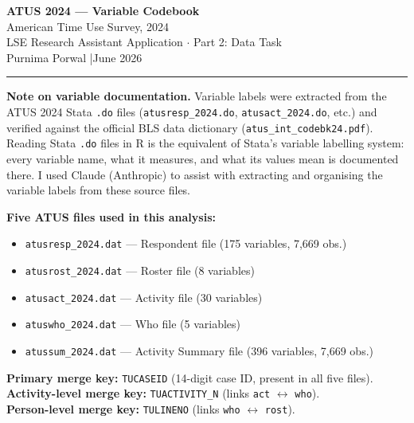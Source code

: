\documentclass[11pt, a4paper]{article}
\begin{document}

\begin{center}
{\LARGE\bfseries\color{headerblue}ATUS 2024 --- Variable Codebook}\\[6pt]
{\large American Time Use Survey, 2024}\\[4pt]
{\normalsize LSE Research Assistant Application $\cdot$ Part 2: Data Task}\\[4pt]
{\normalsize Purnima Porwal \quad|\quad June 2026}
\end{center}
\vspace{6pt}\hrule\vspace{10pt}

\begin{tcolorbox}[notebox]
\textbf{Note on variable documentation.}
Variable labels were extracted from the ATUS 2024 Stata \texttt{.do} files
(\texttt{atusresp\_2024.do}, \texttt{atusact\_2024.do}, etc.) and verified
against the official BLS data dictionary (\texttt{atus\_int\_codebk24.pdf}).
Reading Stata \texttt{.do} files in R is the equivalent of Stata's variable
labelling system: every variable name, what it measures, and what its values
mean is documented there. I used Claude (Anthropic) to assist with extracting
and organising the variable labels from these source files.
\end{tcolorbox}

\vspace{6pt}
\textbf{Five ATUS files used in this analysis:}
\begin{itemize}[nosep, leftmargin=1.4em]
  \item \texttt{atusresp\_2024.dat} --- Respondent file (175 variables, 7{,}669 obs.)
  \item \texttt{atusrost\_2024.dat} --- Roster file (8 variables)
  \item \texttt{atusact\_2024.dat} --- Activity file (30 variables)
  \item \texttt{atuswho\_2024.dat} --- Who file (5 variables)
  \item \texttt{atussum\_2024.dat} --- Activity Summary file (396 variables, 7{,}669 obs.)
\end{itemize}

\smallskip
\textbf{Primary merge key:} \texttt{TUCASEID} (14-digit case ID, present in all five files).\\
\textbf{Activity-level merge key:} \texttt{TUACTIVITY\_N} (links \texttt{act} $\leftrightarrow$ \texttt{who}).\\
\textbf{Person-level merge key:} \texttt{TULINENO} (links \texttt{who} $\leftrightarrow$ \texttt{rost}).
\end{document}
